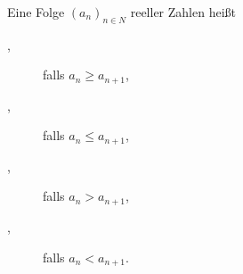 Eine Folge $(a_n)_{n \in N}$ reeller Zahlen heißt 
\begin{description}
    \item[,] falls $a_n \geq a_{n+1}$,
    \item[,] falls $a_n \leq a_{n+1}$,
    \item[,] falls $a_n > a_{n+1}$,
    \item[,] falls $a_n < a_{n+1}$.
\end{description}